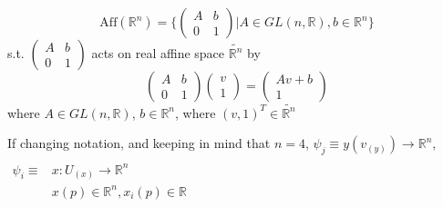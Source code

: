 \begin{definition}
	\begin{equation}
	\text{Aff}(\mathbb{R}^n) = \lbrace \left(\begin{matrix} A & b \\ 0 & 1 \end{matrix} \right) | A \in GL(n, \mathbb{R}), b \in \mathbb{R}^n \rbrace
	\end{equation}
	s.t. $\left(\begin{matrix} A & b \\ 0 & 1 \end{matrix} \right)$ acts on real affine space $\widetilde{\mathbb{R}^n}$ by 
	\begin{equation}
	\left( \begin{matrix} A & b \\ 0 & 1 \end{matrix} \right) \left( \begin{matrix} v \\ 1 \end{matrix} \right) = \left( \begin{matrix} Av + b \\ 1 \end{matrix} \right) 
	\end{equation} where $A \in GL(n, \mathbb{R})$, $b\in \mathbb{R}^n$, where $(v,1)^T \in \widetilde{\mathbb{R}^n}$
\end{definition}

If changing notation, and keeping in mind that $n=4$, $\psi_j \equiv y(v_{(y)}) \to \mathbb{R}^n$, \\
$ \begin{aligned} & \quad \\ 
\psi_i \equiv & x : U_{(x)} \to \mathbb{R}^n \\ 
& x(p) \in \mathbb{R}^n, x_i(p) \in \mathbb{R} \end{aligned}$ \\

